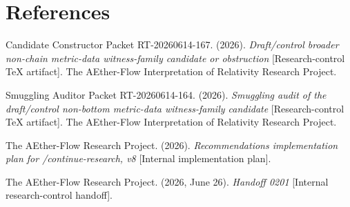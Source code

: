 \documentclass[11pt]{article}
\begin{document}
\section{References}

Candidate Constructor Packet RT-20260614-167. (2026). \emph{Draft/control
broader non-chain metric-data witness-family candidate or obstruction}
[Research-control TeX artifact]. The AEther-Flow Interpretation of
Relativity Research Project.

Smuggling Auditor Packet RT-20260614-164. (2026). \emph{Smuggling audit of
the draft/control non-bottom metric-data witness-family candidate}
[Research-control TeX artifact]. The AEther-Flow Interpretation of
Relativity Research Project.

The AEther-Flow Research Project. (2026). \emph{Recommendations
implementation plan for /continue-research, v8} [Internal implementation
plan].

The AEther-Flow Research Project. (2026, June 26). \emph{Handoff 0201}
[Internal research-control handoff].
\end{document}
